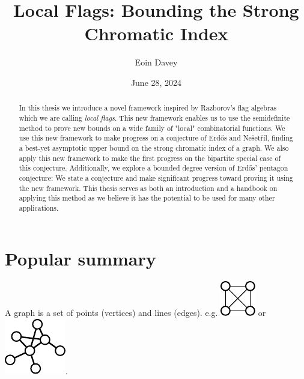 \documentclass{uvamath}
\title{Local Flags: Bounding the Strong Chromatic Index} %
\author[eoin.davey@student.uva.nl, 14246287]{Eoin Davey} %
\date{June 28, 2024} %
\begin{document}
\maketitle
\restoregeometry

\begin{abstract}
    In this thesis we introduce a novel framework inspired by Razborov's flag algebras
    which we are calling \textit{local flags}. This new framework enables us to use
    the semidefinite method to prove new bounds on a wide family of "local" combinatorial
    functions. We use this new framework to
    make progress on a conjecture of Erd\H{o}s and Nešetřil, finding a
    best-yet asymptotic upper bound on the strong chromatic index of a graph.
    We also apply this new framework to make the first progress on the bipartite special case of
    this conjecture.
    Additionally, we explore a bounded degree version of Erd\H{o}s' pentagon
    conjecture: We state a conjecture and make significant progress toward proving it using
    the new framework. This thesis serves as both an introduction and a handbook on applying
    this method as we believe it has the potential to be used for many other applications.
\end{abstract}

\setcounter{tocdepth}{1}
\tableofcontents












\chapter*{Popular summary}
A graph is a set of points (vertices) and lines (edges).
e.g. \includegraphics[align=c,scale=1]{flags/k4} or
\includegraphics[align=c,scale=0.75]{pop_sum_graph}.
\end{document}
